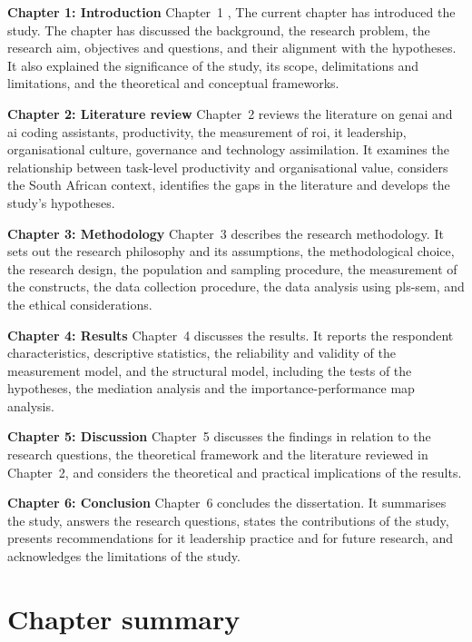 \textbf{Chapter 1: Introduction} \newline
Chapter~1 , The current chapter has introduced the study. The chapter has discussed the background, the research problem, the research aim, objectives and questions, and their alignment with the hypotheses. It also explained the significance of the study, its scope, delimitations and limitations, and the theoretical and conceptual frameworks.

\textbf{Chapter 2: Literature review} \newline
Chapter~2 reviews the literature on \gls{genai} and \gls{ai} coding assistants, productivity, the measurement of \gls{roi}, \gls{it} leadership, organisational culture, governance and technology assimilation. It examines the relationship between task-level productivity and organisational value, considers the South African context, identifies the gaps in the literature and develops the study's hypotheses.

\textbf{Chapter 3: Methodology} \newline
Chapter~3 describes the research methodology. It sets out the research philosophy and its assumptions, the methodological choice, the research design, the population and sampling procedure, the measurement of the constructs, the data collection procedure, the data analysis using \gls{pls-sem}, and the ethical considerations.

\textbf{Chapter 4: Results} \newline
Chapter~4 discusses the results. It reports the respondent characteristics, descriptive statistics, the reliability and validity of the measurement model, and the structural model, including the tests of the hypotheses, the mediation analysis and the importance-performance map analysis.

\textbf{Chapter 5: Discussion} \newline
Chapter~5 discusses the findings in relation to the research questions, the theoretical framework and the literature reviewed in Chapter~2, and considers the theoretical and practical implications of the results.

\textbf{Chapter 6: Conclusion} \newline
Chapter~6 concludes the dissertation. It summarises the study, answers the research questions, states the contributions of the study, presents recommendations for \gls{it} leadership practice and for future research, and acknowledges the limitations of the study.

\section{Chapter summary}
\label{sec:ch1-summary}

